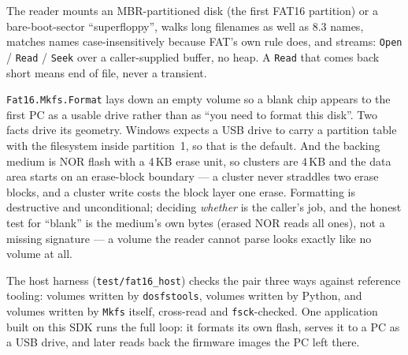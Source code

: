 The reader mounts an MBR-partitioned disk (the first FAT16 partition) or a
bare-boot-sector ``superfloppy'', walks long filenames as well as 8.3 names,
matches names case-insensitively because FAT's own rule does, and streams:
\texttt{Open} / \texttt{Read} / \texttt{Seek} over a caller-supplied buffer,
no heap. A \texttt{Read} that comes back short means end of file, never a
transient.

\texttt{Fat16.Mkfs.Format} lays down an empty volume so a blank chip appears
to the first PC as a usable drive rather than as ``you need to format this
disk''. Two facts drive its geometry. Windows expects a USB drive to carry a
partition table with the filesystem inside partition~1, so that is the
default. And the backing medium is NOR flash with a 4\,KB erase unit, so
clusters are 4\,KB and the data area starts on an erase-block boundary --- a
cluster never straddles two erase blocks, and a cluster write costs the block
layer one erase. Formatting is destructive and unconditional; deciding
\emph{whether} is the caller's job, and the honest test for ``blank'' is the
medium's own bytes (erased NOR reads all ones), not a missing signature ---
a volume the reader cannot parse looks exactly like no volume at all.

The host harness (\texttt{test/fat16\_host}) checks the pair three ways
against reference tooling: volumes written by \texttt{dosfstools}, volumes
written by Python, and volumes written by \texttt{Mkfs} itself, cross-read
and \texttt{fsck}-checked. One application built on this SDK runs the full
loop: it formats its own flash, serves it to a PC as a USB drive, and later
reads back the firmware images the PC left there.

